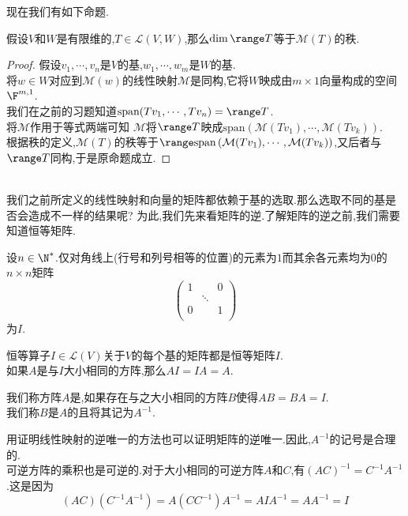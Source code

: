 \documentclass{ctexart}
\begin{document}
现在我们有如下命题.
\begin{formal}[1.4 线性映射的值域和矩阵的秩]
    假设$V$和$W$是有限维的,$T\in\mathcal{L}(V,W)$,那么$\dim\range T$等于$\mathcal{M}(T)$的秩.
\end{formal}
\begin{proof}
    假设$v_1,\cdots,v_n$是$V$的基,$w_1,\cdots,w_m$是$W$的基.\\
    将$w\in W$对应到$\mathcal{M}(w)$的线性映射$\mathcal{M}$是同构,它将$W$映成由$m\times 1$向量构成的空间$\F^{m,1}$.\\
    我们在之前的习题知道$\text{span}(Tv_1,\cdots,Tv_n)=\range T$.\\
    将$\mathcal{M}$作用于等式两端可知
    $\mathcal{M}$将$\range T$映成$\text{span}\left(\mathcal{M}(Tv_1),\cdots,\mathcal{M}(Tv_k)\right)$.\\
    根据秩的定义,$\mathcal{M}(T)$的秩等于$\range\text{span}\left(\mathcal{M}(Tv_1),\cdots,\mathcal{M}(Tv_k)\right)$,又后者与$\range T$同构,于是原命题成立.
\end{proof}\noindent
{}\\
我们之前所定义的线性映射和向量的矩阵都依赖于基的选取.那么选取不同的基是否会造成不一样的结果呢?
为此,我们先来看矩阵的逆.了解矩阵的逆之前,我们需要知道恒等矩阵.
\begin{definition}[2.1 恒等矩阵]
    设$n\in\N^*$.仅对角线上(行号和列号相等的位置)的元素为$1$而其余各元素均为$0$的$n\times n$矩阵
    $$\begin{pmatrix}
        1 &       & 0 \\
          &\ddots &   \\
        0 &       & 1 \\
    \end{pmatrix}$$
    为$I$.
\end{definition}\noindent
恒等算子$I\in\mathcal{L}(V)$关于$V$的每个基的矩阵都是恒等矩阵$I$.\\
如果$A$是与$I$大小相同的方阵,那么$AI=IA=A$.
\begin{definition}[2.2 定义:可逆的,逆]
    我们称方阵$A$是,如果存在与之大小相同的方阵$B$使得$AB=BA=I$.\\
    我们称$B$是$A$的且将其记为$A^{-1}$.
\end{definition}\noindent
用证明线性映射的逆唯一的方法也可以证明矩阵的逆唯一.因此,$A^{-1}$的记号是合理的.\\
可逆方阵的乘积也是可逆的.对于大小相同的可逆方阵$A$和$C$,有$(AC)^{-1}=C^{-1}A^{-1}$.这是因为
$$(AC)(C^{-1}A^{-1})=A(CC^{-1})A^{-1}=AIA^{-1}=AA^{-1}=I$$
\end{document}

